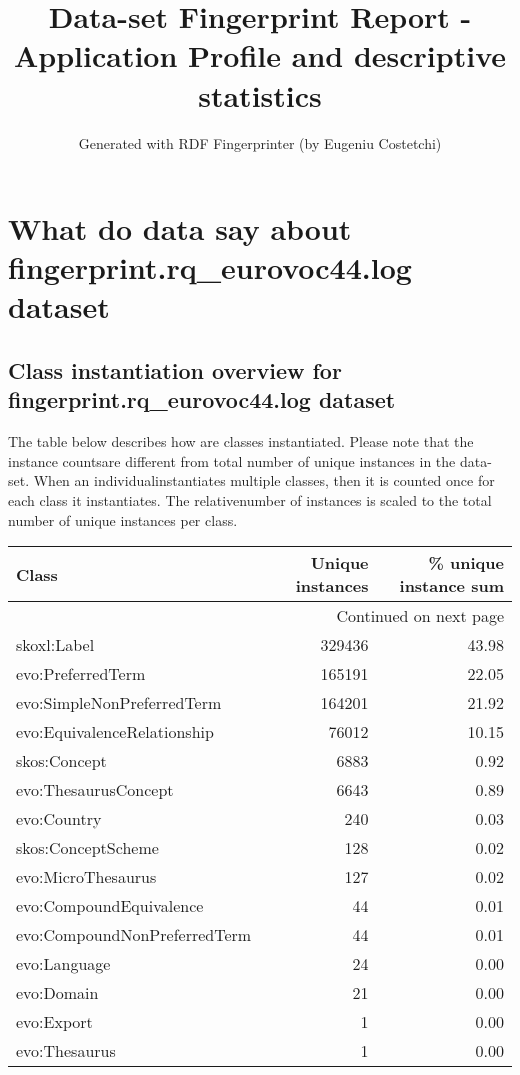 \documentclass[10pt,a4paper,titlepage,final]{article}
\author{Generated with RDF Fingerprinter (by Eugeniu Costetchi)}
\title{Data-set Fingerprint Report - Application Profile and descriptive statistics}
\begin{document}
\maketitle
\tableofcontents
\newpage
\section{What do data say about fingerprint.rq\_eurovoc44.log dataset}
\subsection{Class instantiation overview for fingerprint.rq\_eurovoc44.log dataset}
The table below describes how are classes instantiated. Please note that the instance countsare different from total number of unique instances in the data{-}set. When an individualinstantiates multiple classes, then it is counted once for each class it instantiates. The relativenumber of instances is scaled to the total number of unique instances per class.
\begin{longtable}{lrr}
\toprule
                        Class &  Unique instances &  \% unique instance sum \\
\midrule
\endhead
\midrule
\multicolumn{3}{r}{{Continued on next page}} \\
\midrule
\endfoot

\bottomrule
\endlastfoot
                  skoxl:Label &            329436 &                  43.98 \\
            evo:PreferredTerm &            165191 &                  22.05 \\
   evo:SimpleNonPreferredTerm &            164201 &                  21.92 \\
  evo:EquivalenceRelationship &             76012 &                  10.15 \\
                 skos:Concept &              6883 &                   0.92 \\
         evo:ThesaurusConcept &              6643 &                   0.89 \\
                  evo:Country &               240 &                   0.03 \\
           skos:ConceptScheme &               128 &                   0.02 \\
           evo:MicroThesaurus &               127 &                   0.02 \\
      evo:CompoundEquivalence &                44 &                   0.01 \\
 evo:CompoundNonPreferredTerm &                44 &                   0.01 \\
                 evo:Language &                24 &                   0.00 \\
                   evo:Domain &                21 &                   0.00 \\
                   evo:Export &                 1 &                   0.00 \\
                evo:Thesaurus &                 1 &                   0.00 \\
\end{longtable}
\end{document}
